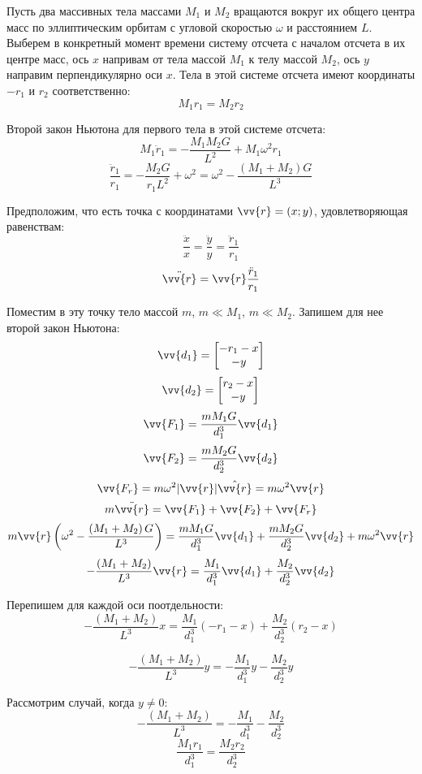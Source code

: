 \documentclass{article}
\begin{document}
    \onehalfspacing
    
    Пусть два массивных тела массами $M_1$ и $M_2$ вращаются вокруг их общего центра масс по эллиптическим орбитам с угловой скоростью $\omega$ и расстоянием $L$.
    Выберем в конкретный момент времени систему отсчета с началом отсчета в их центре масс, ось $x$ напривам от тела массой $M_1$ к телу  массой $M_2$,
    ось $y$ направим перпендикулярно оси $x$. Тела в этой системе отсчета имеют координаты $-r_1$ и $r_2$ соответственно:
    \[ M_1 r_1 = M_2 r_2 \]

    Второй закон Ньютона для первого тела в этой системе отсчета:
    \[ M_1 \ddot r_1 = -\frac{M_1 M_2 G}{L^2} + M_1 \omega^2 r_1 \]
    \[ \frac{\ddot r_1}{r_1} = -\frac{M_2 G}{r_1 L^2} + \omega^2 = \omega^2 - \frac{\left( M_1 + M_2 \right) G}{L^3}\]
    
    Предположим, что есть точка с координатами $\vv{r} = (x;y)$, удовлетворяющая равенствам: 
    \[ \frac{\ddot x}{x} = \frac{\ddot y}{y} = \frac{\ddot r_1}{r_1} \]
    \[ \ddot{\vv{r}} = \vv{r} \frac{\ddot r_1}{r_1} \]
    
    Поместим в эту точку тело массой $m$, $m \ll M_1$, $m \ll M_2$. Запишем для нее второй закон Ньютона:
    \[ \vv{d_1} = \begin{bmatrix} -r_1 - x \\ - y \end{bmatrix} \]
    \[ \vv{d_2} = \begin{bmatrix} r_2 - x \\ - y \end{bmatrix} \]
    \[ \vv{F_1} = \frac{mM_1G}{d_1^3} \vv{d_1} \]
    \[ \vv{F_2} = \frac{mM_2G}{d_2^3} \vv{d_2} \]
    \[ \vv{F_r} = m \omega^2 |\vv{r}| \hat{{\vv{r}}} = m \omega^2 \vv{r} \]
    \[ m \ddot{\vv{r}} = \vv{F_1} + \vv{F_2} + \vv{F_r} \]
    \[ m \vv{r} \left( \omega^2 - \frac{\left( M_1 + M_2 \right) G}{L^3} \right) =
       \frac{mM_1G}{d_1^3} \vv{d_1} + \frac{mM_2G}{d_2^3} \vv{d_2} + m \omega^2 \vv{r}\]
    \[ - \frac{\left( M_1 + M_2 \right) }{L^3} \vv{r} =
       \frac{M_1}{d_1^3} \vv{d_1} + \frac{M_2}{d_2^3} \vv{d_2} \]

    Перепишем для каждой оси поотдельности:
    \[ -\frac{\left( M_1 + M_2 \right) }{L^3} x =
       \frac{M_1}{d_1^3} (-r_1 - x) + \frac{M_2}{d_2^3} (r_2 - x) \]
    
    \[ -\frac{\left( M_1 + M_2 \right) }{L^3} y =
       -\frac{M_1}{d_1^3} y - \frac{M_2}{d_2^3} y \]

    Рассмотрим случай, когда $y \ne 0$:
    \[ -\frac{\left( M_1 + M_2 \right) }{L^3} =
       -\frac{M_1}{d_1^3} - \frac{M_2}{d_2^3} \]
    \[ \frac{M_1 r_1}{d_1^3} = \frac{M_2 r_2}{d_2^3} \]
    
\end{document}
